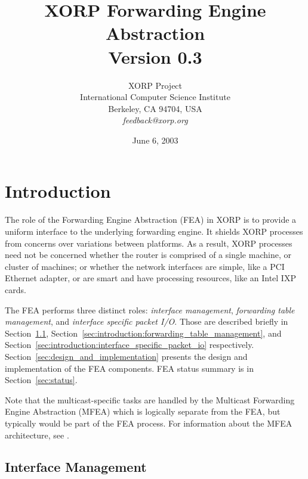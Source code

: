 \documentclass[11pt]{article}
\begin{document}
\title{XORP Forwarding Engine Abstraction \\
\vspace{1ex}
Version 0.3}
\author{ XORP Project					\\
	 International Computer Science Institute	\\
	 Berkeley, CA 94704, USA			\\
	 {\it feedback@xorp.org}
}
\date{June 6, 2003}

\maketitle

\thispagestyle{empty}


\section{Introduction}
\label{sec:introduction}

The role of the Forwarding Engine Abstraction (FEA) in XORP is to
provide a uniform interface to the underlying forwarding engine.  It
shields XORP processes from concerns over variations between
platforms.  As a result, XORP processes need not be concerned whether
the router is comprised of a single machine, or cluster of machines;
or whether the network interfaces are simple, like a PCI Ethernet
adapter, or are smart and have processing resources, like an Intel IXP
cards.

The FEA performs three distinct roles: \emph{interface management},
\emph{forwarding table management}, and \emph{interface specific
packet I/O}.  Those are described briefly in
Section~\ref{sec:introduction:interface_management},
Section~\ref{sec:introduction:forwarding_table_management},
and Section~\ref{sec:introduction:interface_specific_packet_io}
respectively.
Section~\ref{sec:design_and_implementation} presents
the design and implementation of the FEA components.
FEA status summary is in Section~\ref{sec:status}.

Note that the multicast-specific tasks are handled by the Multicast
Forwarding Engine Abstraction (MFEA) which is logically separate from
the FEA, but typically would be part of the FEA process.
For information about the MFEA architecture, see \cite{xorp:mfea}.

\subsection{Interface Management}
\label{sec:introduction:interface_management}
\end{document}
